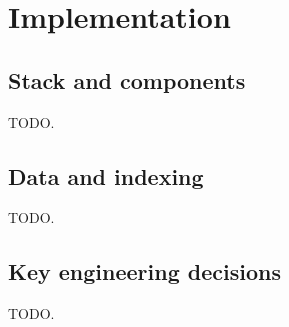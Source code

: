 \section{Implementation}
\label{sec:impl}


\subsection{Stack and components}
TODO.

\subsection{Data and indexing}
TODO.

\subsection{Key engineering decisions}
TODO.

